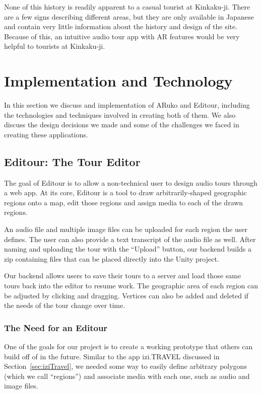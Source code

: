 \documentclass[a4paper, 10pt, american, titlepage]{article}
\begin{document}
None of this history is readily apparent to a casual tourist at Kinkaku-ji.
There are a few signs describing different areas, but they are only available in
Japanese and contain very little information about the history and design of the
site. Because of this, an intuitive audio tour app with AR features would be
very helpful to tourists at Kinkaku-ji.

\clearpage

\section{Implementation and Technology}
\label{sec:implementationAndTechnology}

In this section we discuss and implementation of ARuko and Editour, including
the technologies and techniques involved in creating both of them. We also
discuss the design decisions we made and some of the challenges we faced in
creating these applications.

\subsection{Editour: The Tour Editor}
\label{sec:editour}

The goal of Editour is to allow a non-technical user to design audio tours
through a web app. At its core, Editour is a tool to draw arbitrarily-shaped
geographic regions onto a map, edit those regions and assign media to each of
the drawn regions.

An audio file and multiple image files can be uploaded for each region the user
defines. The user can also provide a text transcript of the audio file as well.
After naming and uploading the tour with the ``Upload'' button, our backend
builds a zip containing files that can be placed directly into the Unity
project.

Our backend allows users to save their tours to a server and load those same
tours back into the editor to resume work. The geographic area of each region
can be adjusted by clicking and dragging. Vertices can also be added and
deleted if the needs of the tour change over time.

\subsubsection{The Need for an Editour}
\label{sec:theNeedForAnEditour}

One of the goals for our project is to create a working prototype that others
can build off of in the future. Similar to the app izi.TRAVEL discussed in
Section~\ref{sec:iziTravel}, we needed some way to easily define arbitrary
polygons (which we call ``regions'') and associate media with each one, such as
audio and image files.
\end{document}
